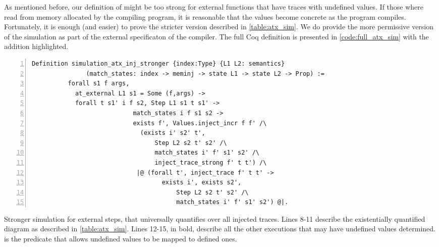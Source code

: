 As mentioned before, our definition of  might be too strong for external functions that have traces with undefined values. If those where read from memory allocated by the compiling program, it is reasonable that the values become concrete as the program compiles. Fortunately, it is enough (and easier) to prove the stricter version described in \ref{table:atx_sim}. We do provide the more permissive version of the simulation as part of the external specificaton of the compiler. The full Coq definition is presented in \ref{code:full_atx_sim} with the addition highlighted.  

\begin{table}\label{fig:simulation_atxX}
\begin{lstlisting}[numbers=left] 
Definition simulation_atx_inj_stronger {index:Type} {L1 L2: semantics}
               (match_states: index -> meminj -> state L1 -> state L2 -> Prop) :=
          forall s1 f args,
            at_external L1 s1 = Some (f,args) -> 
            forall t s1' i f s2, Step L1 s1 t s1' ->
                            match_states i f s1 s2 ->
                            exists f', Values.inject_incr f f' /\
                              (exists i' s2' t',
                                  Step L2 s2 t' s2' /\
                                  match_states i' f' s1' s2' /\
                                  inject_trace_strong f' t t') /\
                             |@ (forall t', inject_trace f' t t' -> 
                              		exists i', exists s2',
                                    	Step L2 s2 t' s2' /\
                                    	match_states i' f' s1' s2') @|.
\end{lstlisting}
\caption{Stronger simulation for external steps, that universally quantifies over all injected traces. Lines 8-11 describe the existentially quantified diagram as described in \ref{table:atx_sim}. Lines 12-15, in bold, describe all the other executions that may have undefined values determined.  is the predicate that allows undefined values to be mapped to defined ones. }\label{code:full_atx_sim}
\end{table}

